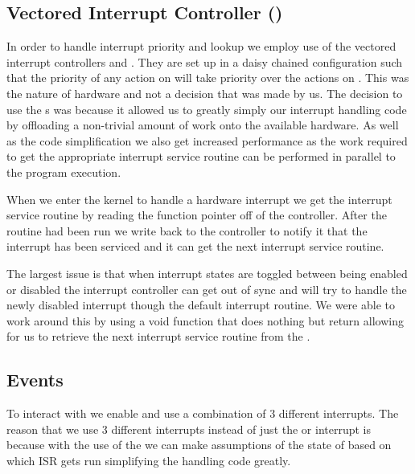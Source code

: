 \documentclass[pdftex,10pt,a4paper]{article}
\begin{document}
\subsection*{Vectored Interrupt Controller ()}

In order to handle interrupt priority and lookup we employ use of the vectored
interrupt controllers  and . They are set up in a daisy
chained configuration such that the priority of any action on  will
take priority over the actions on . This was the nature of hardware
and not a decision that was made by us. The decision to use the s was
because it allowed us to greatly simply our interrupt handling code by
offloading a non-trivial amount of work onto the available hardware. As well
as the code simplification we also get increased performance as the work
required to get the appropriate interrupt service routine can be performed in
parallel to the program execution.

When we enter the kernel to handle a hardware interrupt we get the interrupt
service routine by reading the function pointer off of the 
controller. After the routine had been run we write back to the controller to
notify it that the interrupt has been serviced and it can get the next
interrupt service routine.

The largest issue is that when interrupt states are toggled between being
enabled or disabled the interrupt controller can get out of sync and will try
to handle the newly disabled interrupt though the default interrupt routine.
We were able to work around this by using a void function that does nothing but
return allowing for us to retrieve the next interrupt service routine from the
.

\subsection*{ Events}
To interact with  we enable and use a combination of 3 different
interrupts. The reason that we use 3 different interrupts instead of just the
 or interrupt is because with the use of the  we can make
assumptions of the state of  based on which ISR gets run simplifying
the  handling code greatly.
\end{document}
